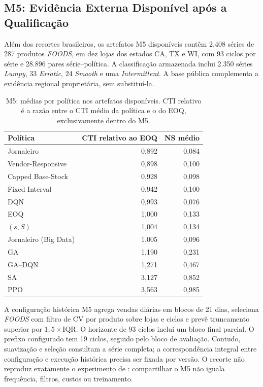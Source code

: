 \subsection{M5: Evidência Externa Disponível após a Qualificação}
\label{sec:resultados_m5}

Além dos recortes brasileiros, os artefatos M5 disponíveis contêm 2.408 séries de 287 produtos \textit{FOODS}, em dez lojas dos estados CA, TX e WI, com 93 ciclos por série e 28.896 pares série--política. A classificação armazenada inclui 2.350 séries \textit{Lumpy}, 33 \textit{Erratic}, 24 \textit{Smooth} e uma \textit{Intermittent}. A base pública complementa a evidência regional proprietária, sem substituí-la.

\begin{table}[ht]
\centering\small
\caption{M5: médias por política nos artefatos disponíveis. CTI relativo é a razão entre o CTI médio da política e o do EOQ, exclusivamente dentro do M5.}
\label{tab:m5_sintese}
\begin{tabular}{@{}lrr@{}}
\toprule
Política & CTI relativo ao EOQ & NS médio\\
\midrule
Jornaleiro &0,892&0,084\\
Vendor-Responsive &0,898&0,100\\
Capped Base-Stock &0,928&0,098\\
Fixed Interval &0,942&0,100\\
DQN &0,993&0,076\\
EOQ &1,000&0,133\\
$(s,S)$ &1,004&0,134\\
Jornaleiro (Big Data) &1,005&0,096\\
GA &1,190&0,231\\
GA--DQN &1,271&0,467\\
SA &3,127&0,852\\
PPO &3,563&0,985\\
\bottomrule
\end{tabular}
\end{table}

A configuração histórica M5 agrega vendas diárias em blocos de 21 dias, seleciona \textit{FOODS} com filtro de CV por produto sobre lojas e ciclos e prevê truncamento superior por $1{,}5\times\mathrm{IQR}$. O horizonte de 93 ciclos inclui um bloco final parcial. O prefixo configurado tem 19 ciclos, seguido pelo bloco de avaliação. Contudo, suavização e seleção consultam a série completa; a correspondência integral entre configuração e execução histórica precisa ser fixada por versão. O recorte não reproduz exatamente o experimento de \citet{Zabraoui2025GaDQN}: compartilhar o M5 não iguala frequência, filtros, custos ou treinamento.

